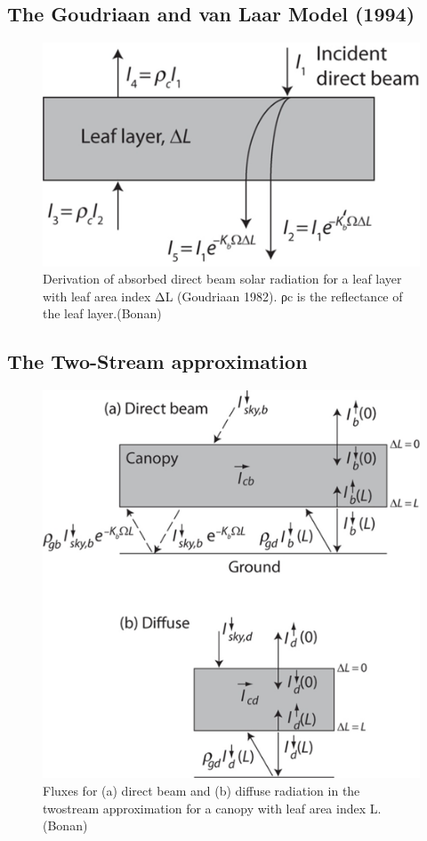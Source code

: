 \documentclass[12pt,oneside]{book}
\begin{document}
\subsection{The Goudriaan and van Laar Model
(1994)}\label{the-goudriaan-and-van-laar-model-1994}

\begin{figure}

{\centering \includegraphics[width=0.8\linewidth]{figures/chap3/f320_goudriaan} 

}

\caption{ Derivation of absorbed direct beam solar radiation for a leaf layer with leaf area index ΔL (Goudriaan 1982). ρc is the reflectance of the leaf layer.(Bonan)}\label{fig:f320}
\end{figure}

\subsection{The Two-Stream
approximation}\label{the-two-stream-approximation}

\begin{figure}

{\centering \includegraphics[width=0.8\linewidth]{figures/chap3/f321_two_stream} 

}

\caption{Fluxes for (a) direct beam and (b) diffuse radiation in the twostream approximation for a canopy with leaf area index L.(Bonan)}\label{fig:f321}
\end{figure}
\end{document}
